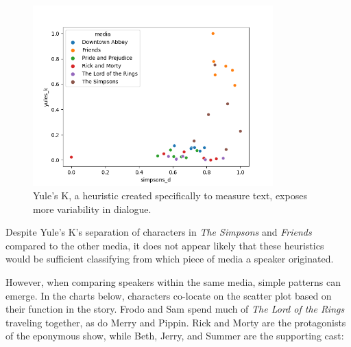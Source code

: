 \documentclass{article}
\newcommand{\largeimagewidth}{350}
\begin{document}
\begin{titlepage}
\begin{figure}[H]
\centering
\includegraphics[width=\largeimagewidth]{images/heuristics.png}
\caption{Yule's K, a heuristic created specifically to measure text, exposes more variability in dialogue.}
\end{figure}

Despite Yule's K's separation of characters in \textit{The Simpsons} and \textit{Friends} compared to the other media, it does not appear likely that these heuristics would be sufficient classifying from which piece of media a speaker originated.

However, when comparing speakers within the same media, simple patterns can emerge. In the charts below, characters co-locate on the scatter plot based on their function in the story. Frodo and Sam spend much of \textit{The Lord of the Rings} traveling together, as do Merry and Pippin. Rick and Morty are the protagonists of the eponymous show, while Beth, Jerry, and Summer are the supporting cast:


\end{titlepage}
\end{document}
